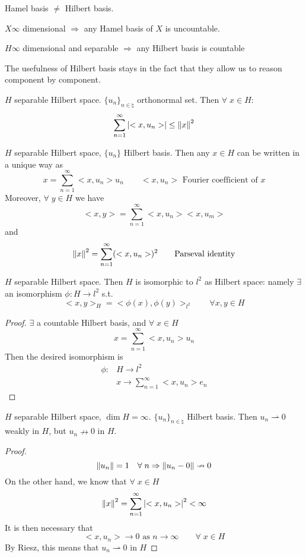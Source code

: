 \begin{remark}
    Hamel basis \(\neq\) Hilbert basis.

    \(X \infty\) dimensional \(\Rightarrow\) any Hamel basis of \(X\) is uncountable.

    \(H \infty\) dimensional and separable \(\Rightarrow\) any Hilbert basis is countable
\end{remark}

The usefulness of Hilbert basis stays in the fact that they allow us to reason component by component.

\begin{theorem}
    \(H\) separable Hilbert space. \(\{u_n\}_{n \in \natural}\) orthonormal set. Then \(\forall \; x \in H\):
    \[
        \sum_{n=1}^\infty \abs{<x, u_n>} \leq \norm{x}^2
    \]
\end{theorem}
\begin{theorem}
    \(H\) separable Hilbert space, \(\{u_n\}\) Hilbert basis.
    Then any \(x \in H\) can be written in a unique way as 
    \[
        x = \sum_{n=1}^\infty <x, u_n> u_n \qquad <x, u_n> \text{ Fourier coefficient of }x
    \]
    Moreover, \(\forall\; y \in H\) we have
    \[
        <x, y> = \sum_{n=1}^\infty <x, u_n> <x, u_m>
    \]
    and 
    \[
        \norm{x}^2 = \sum_{n=1}^\infty (<x, u_n>)^2 \tag*{Parseval identity}
    \]
\end{theorem}
\begin{theorem}
    \(H\) separable Hilbert space. Then \(H\) is isomorphic to \(l^2\) as Hilbert space: namely \(\exists\) an isomorphism \(\phi: H \to l^2\) s.t.
    \[
        <x, y>_H = <\phi(x), \phi(y)>_{l^2} \qquad \forall x, y \in H
    \]
\end{theorem}
\begin{proof}
    \(\exists\) a countable Hilbert basis, and \(\forall\; x \in H\)
    \[
        x = \sum_{n=1}^\infty <x, u_n> u_n
    \]
    Then the desired isomorphism is
    \[
        \begin{array}{rl}
            \phi: & H \to l^2 \\
            & x \to \sum_{n=1}^\infty <x, u_n> e_n
        \end{array}
    \]
\end{proof}

\begin{corollary}
    \(H\) separable Hilbert space, \(\dim H = \infty\). \(\{u_n\}_{n \in \natural}\) Hilbert basis. Then \(u_n \rightharpoonup 0\) weakly in \(H\), but \(u_n \nrightarrow 0\) in \(H\).
\end{corollary}
\begin{proof}
    \[
        \norm{u_n}=1 \quad \forall\; n \Rightarrow \norm{u_n -0} \nrightarrow 0 
    \]
    On the other hand, we know that \(\forall \; x \in H\)
    \[
        \norm{x}^2 = \sum_{n=1}^\infty \abs{<x, u_n>}^2 < \infty
    \]
    It is then necessary that
    \[
        <x, u_n> \to 0 \text{ as } n \to \infty \qquad \forall\; x \in H
    \]
    By Riesz, this means that \(u_n \rightharpoonup 0\) in \(H\)
\end{proof}

